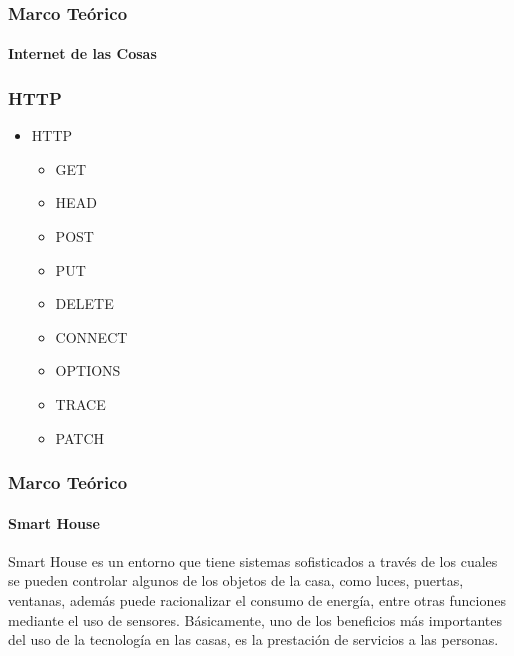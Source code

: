 \begin{frame}
\frametitle{Marco Teórico}
\framesubtitle{Internet de las Cosas}
\subsubsection{HTTP}
\begin{itemize}\item HTTP
	\begin{itemize}
		\item GET%
		\item HEAD%
		\item POST%
		\item PUT%
		\item DELETE%
		\item CONNECT%
		\item OPTIONS%
		\item TRACE%
		\item PATCH%
	\end{itemize}
\end{itemize}

\end{frame}

\begin{frame}
\frametitle{Marco Teórico}
\framesubtitle{Smart House}

Smart House es un entorno que tiene sistemas sofisticados a través de los cuales se pueden controlar algunos de los objetos de la casa, como luces, puertas, ventanas, además puede racionalizar el consumo de energía, entre otras funciones mediante el uso de sensores. Básicamente, uno de los beneficios más importantes del uso de la tecnología en las casas, es la prestación de servicios a las personas.\cite{Howedi2016} 
\end{frame}

